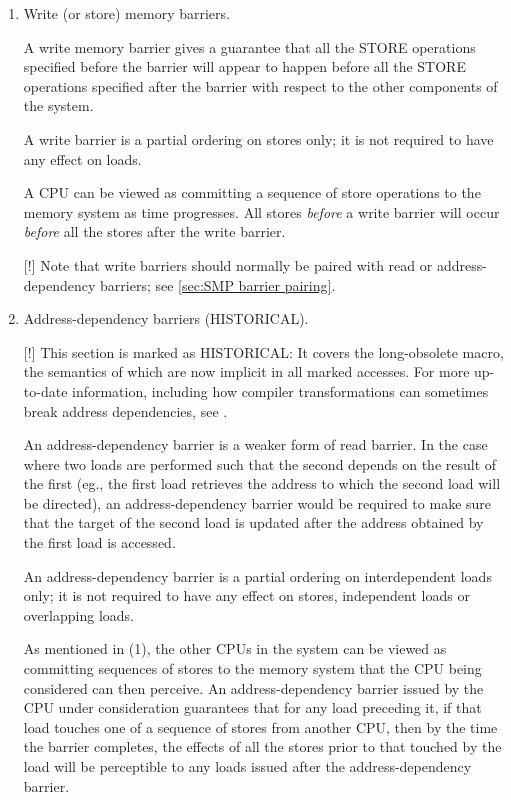 \begin{enumerate}
 \item
     Write (or store) memory barriers.

     A write memory barrier gives a guarantee that all the STORE operations
     specified before the barrier will appear to happen before all the STORE
     operations specified after the barrier with respect to the other
     components of the system.

     A write barrier is a partial ordering on stores only; it is not required
     to have any effect on loads.

     A CPU can be viewed as committing a sequence of store operations to the
     memory system as time progresses.
     All stores \emph{before} a write barrier will occur \emph{before} all
     the stores after the write barrier.

     [!] Note that write barriers should normally be paired with read or
     address-dependency barriers; see \cref{sec:SMP barrier pairing}.


 \item
     Address-dependency barriers (HISTORICAL).

     [!] This section is marked as HISTORICAL\@:
     It covers the long-obsolete  macro,
     the semantics of which are now implicit in all marked accesses.
     For more up-to-date information, including how compiler transformations
     can sometimes break address dependencies, see
     .

     An address-dependency barrier is a weaker form of read barrier.
     In the case where two loads are performed such that the second depends
     on the result of the first (eg., the first load retrieves the address
     to which the second load will be directed), an address-dependency
     barrier would be required to make sure that the target of the second
     load is updated after the address obtained by the first load is
     accessed.

     An address-dependency barrier is a partial ordering on interdependent
     loads only; it is not required to have any effect on stores, independent
     loads or overlapping loads.

     As mentioned in (1), the other CPUs in the system can be viewed as
     committing sequences of stores to the memory system that the CPU being
     considered can then perceive.
     An address-dependency barrier issued by the CPU under consideration
     guarantees that for any load preceding it, if that load touches one of
     a sequence of stores from another CPU, then by the time the barrier
     completes, the effects of all the stores prior to that touched by the
     load will be perceptible to any loads issued after the
     address-dependency barrier.


\end{enumerate}
